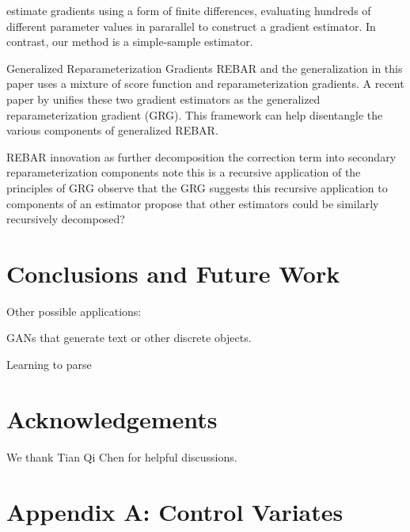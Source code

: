 \documentclass{article}
\begin{document}
\citet{salimans2017evolution} estimate gradients using a form of finite differences, evaluating hundreds of different parameter values in pararallel to construct a gradient estimator.
In contrast, our method is a simple-sample estimator.

\par{Generalized Reparameterization Gradients}
REBAR and the generalization in this paper uses a mixture of score function and reparameterization gradients.
A recent paper by \cite{ruiz2016generalized} unifies these two gradient estimators as the generalized reparameterization gradient (GRG).
This framework can help disentangle the various components of generalized REBAR.

REBAR innovation as further decomposition the correction term into secondary reparameterization components
note this is a recursive application of the principles of GRG
observe that the GRG suggests this recursive application to components of an estimator
propose that other estimators could be similarly recursively decomposed?




\section{Conclusions and Future Work}
\label{conclusion}

Other possible applications:

GANs \citep{goodfellow2014generative} that generate text or other discrete objects.

Learning to parse \citep{kusner2017grammar}


\section*{Acknowledgements}
We thank Tian Qi Chen for helpful discussions.








\section{Appendix A: Control Variates}


\end{document}
